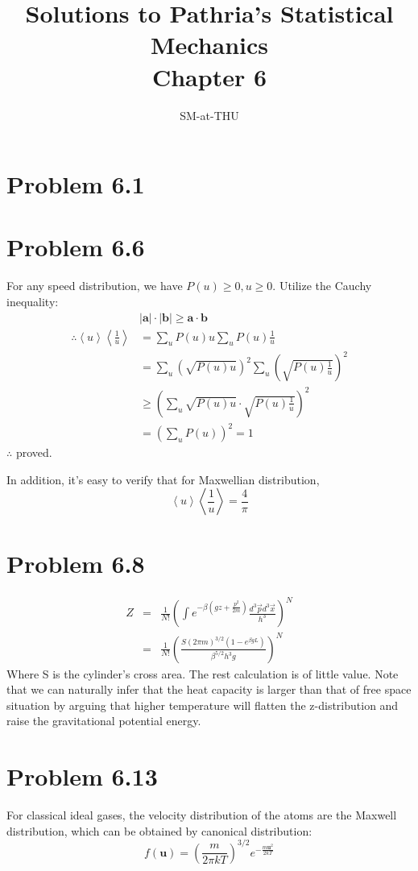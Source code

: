 \documentclass{article}
\author{SM-at-THU}
\title{\bf{Solutions to Pathria's Statistical Mechanics}\\Chapter 6}
\begin{document}
\maketitle
\section*{Problem 6.1}

\section*{Problem 6.6} %
\label{sec:problem_6_6}
	For any speed distribution, we have $ P(u)\ge0,u\ge 0 $. Utilize the Cauchy inequality:
	\begin{align*}
		&|\bm a|\cdot|\bm b|\ge \bm a \cdot \bm b\\
		\therefore \left< u\right> \left< \frac{1}{u} \right>&=\sum_u P(u)u \sum_u P(u)\frac{1}{u}\\
		&=\sum_u \left(\sqrt{P(u)u}\right)^2 \sum_u \left(\sqrt{P(u)  \frac{1}{u} }\right)^2\\
		&\ge \left( \sum_u \sqrt{P(u)u} \cdot \sqrt{P(u)  \frac{1}{u}} \right)^2\\
		&=\left( \sum_u P(u) \right)^2=1
	\end{align*}
	$ \therefore $ proved.

	In addition, it's easy to verify that for Maxwellian distribution,
	\begin{equation}
		\left< u\right> \left< \frac{1}{u} \right>=\frac{4}{\pi}
	\end{equation}



\section*{Problem 6.8}
\begin{eqnarray*}
Z&=&\frac{1}{N!}(\int e^{-\beta (gz+\frac{p^2}{2m})}\frac{d^3\vec{p}d^3\vec{x}}{h^3})^N  \\
&=&\frac{1}{N!}(\frac{S(2\pi m)^{3/2}(1-e^{\beta gL})}{\beta^{5/2}h^3 g})^N
\end{eqnarray*}
Where S is the cylinder's cross area. The rest calculation is of little value. Note that we can naturally infer that the heat capacity is larger than that of free space situation by arguing that higher temperature will flatten the z-distribution and raise the gravitational potential energy.


\section*{Problem 6.13}
For classical ideal gases, the velocity distribution of the atoms are the Maxwell distribution, which can be obtained by canonical distribution:
\begin{equation}
f(\mathbf{u}) = \left(\frac{m}{2\pi kT}\right)^{3/2}e^{-\frac{m\mathbf{u}^2}{2kT}}
\end{equation}
\end{document}
